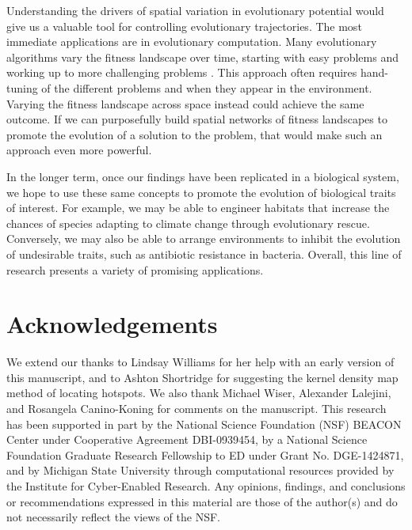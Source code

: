     Understanding the drivers of spatial variation in evolutionary potential would give us a valuable tool for controlling evolutionary trajectories. The most immediate applications are in evolutionary computation. Many evolutionary algorithms vary the fitness landscape over time, starting with easy problems and working up to more challenging problems \citep{hornby_alps:_2006,ovaska_periodical_2009}. This approach often requires hand-tuning of the different problems and when they appear in the environment. Varying the fitness landscape across space instead could achieve the same outcome. If we can purposefully build spatial networks of fitness landscapes to promote the evolution of a solution to the problem, that would make such an approach even more powerful.  
    
    In the longer term, once our findings have been replicated in a biological system, we hope to use these same concepts to promote the evolution of biological traits of interest. For example, we may be able to engineer habitats that increase the chances of species adapting to climate change through evolutionary rescue. Conversely, we may also be able to arrange environments to inhibit the evolution of undesirable traits, such as antibiotic resistance in bacteria. Overall, this line of research presents a variety of promising applications. 


\section{Acknowledgements}

We extend our thanks to Lindsay Williams for her help with an early version of this manuscript, and to Ashton Shortridge for suggesting the kernel density map method of locating hotspots. We also thank Michael Wiser, Alexander Lalejini, and Rosangela Canino-Koning for comments on the manuscript. This research has been supported in part by the National Science Foundation (NSF) BEACON Center under Cooperative Agreement DBI-0939454, by a National Science Foundation Graduate Research Fellowship to ED under Grant No. DGE-1424871, and by Michigan State University through computational resources provided by the Institute for Cyber-Enabled Research. Any opinions, findings, and conclusions or recommendations expressed in this material are those of the author(s) and do not necessarily reflect the views of the NSF.


\footnotesize


